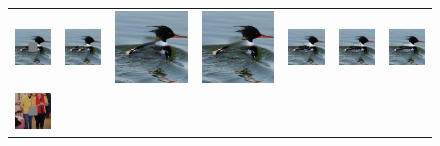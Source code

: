 \begin{figure}[h!]
\centering
\setlength\tabcolsep{1pt}
\begin{tabular}{ccccccc}
\includegraphics[width=.14\textwidth]{figures/imagenet/imagenet_0011_input_image.jpg}&
\includegraphics[width=.14\textwidth]{figures/imagenet/imagenet_0011_pm.jpg}&
\includegraphics[width=.14\textwidth]{figures/imagenet/0011_ce2.jpg}&
\includegraphics[width=.14\textwidth]{figures/imagenet/0011_nps2.jpg}&
\includegraphics[width=.14\textwidth]{figures/imagenet/imagenet_0011_siggraph2017.jpg}&
\includegraphics[width=.14\textwidth]{figures/imagenet/imagenet_0011_g.jpg}&
\includegraphics[width=.14\textwidth]{figures/imagenet/imagenet_0011_synthesized_image.jpg}\\
\includegraphics[width=.14\textwidth]{figures/imagenet/imagenet_0034_input_image.jpg}&

\end{tabular}
\end{figure}
